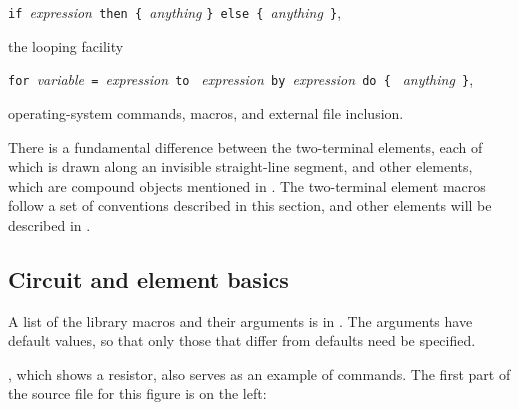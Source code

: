 \verb|if |{\sl expression}\verb| then { |{\sl anything} 
  \verb|} else { |{\sl anything}\verb| }|,

\noindent%
the looping facility

\verb|for |{\sl variable}\verb| = |{\sl expression}\verb| to |%
{\sl expression}\verb| by |{\sl expression}\verb| do { |%
{\sl anything}\verb| }|,

\noindent%
operating-system commands, \pic macros, and external file inclusion.

There is a fundamental difference between the two-terminal elements, each
of which is drawn along an invisible straight-line segment,
and other elements, which are compound objects mentioned
in .
The two-terminal element macros follow a
set of conventions described in this section, and other elements will
be described in .

\subsection{Circuit and element basics\label{Basics:}}
A list of the library macros and their arguments is in
.  The arguments have default values, so that only
those that differ from defaults need be specified.

, which shows a resistor, also serves as
an example of \pic commands.
The first part of the source file for this figure is 
on the left:

